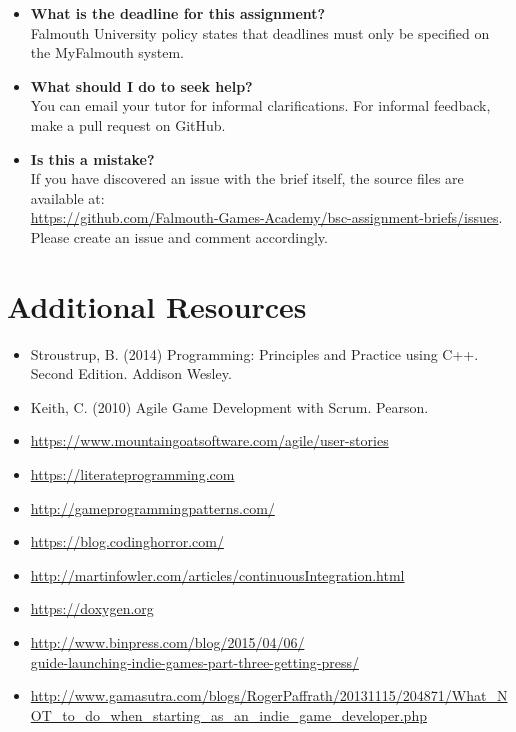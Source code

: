 \documentclass{../../fal_assignment}
\begin{document}
\begin{itemize}
	\item 	\textbf{What is the deadline for this assignment?} \\ 
    		Falmouth University policy states that deadlines must only be specified on the MyFalmouth system.
    		
	\item 	\textbf{What should I do to seek help?} \\ 
    		You can email your tutor for informal clarifications. For informal feedback, make a pull request on GitHub. 
    		
    	\item 	\textbf{Is this a mistake?} \\ 	
    		If you have discovered an issue with the brief itself, the source files are available at: \\
    		\url{https://github.com/Falmouth-Games-Academy/bsc-assignment-briefs/issues}.\\
    		 Please create an issue and comment accordingly.
\end{itemize}

\section*{Additional Resources}

\begin{itemize}
    \item Stroustrup, B. (2014) Programming: Principles and Practice using C++. Second Edition. Addison Wesley.
    \item Keith, C. (2010) Agile Game Development with Scrum. Pearson.
    \item \url{https://www.mountaingoatsoftware.com/agile/user-stories}
    \item \url{https://literateprogramming.com}
    \item \url{http://gameprogrammingpatterns.com/}
    \item \url{https://blog.codinghorror.com/}
    \item \url{http://martinfowler.com/articles/continuousIntegration.html}
    \item \url{https://doxygen.org}
    \item \url{http://www.binpress.com/blog/2015/04/06/}\\ \url{guide-launching-indie-games-part-three-getting-press/}
    \item \url{http://www.gamasutra.com/blogs/RogerPaffrath/20131115/204871/What_NOT_to_do_when_starting_as_an_indie_game_developer.php}
\end{itemize}
\end{document}
